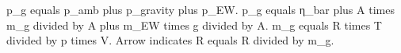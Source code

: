 p_g equals p_amb plus p_gravity plus p_EW.  
p_g equals η_bar plus A times m_g divided by A plus m_EW times g divided by A.  
m_g equals R times T divided by p times V. Arrow indicates R equals R divided by m_g.